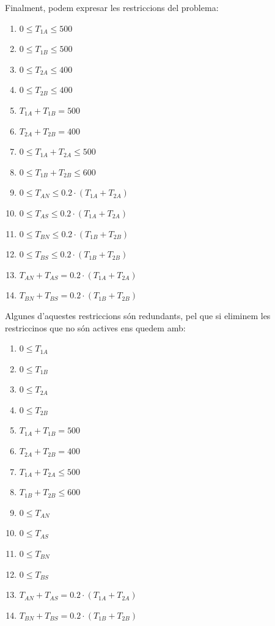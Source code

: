 \documentclass[a4paper, 11pt]{article}
\begin{document}
 \newpage
 \hspace{-1.5em}Finalment, podem expresar les restriccions del problema:
 \begin{enumerate}
     \item  $ 0 \leq T_{1A} \leq 500 $
     \item  $ 0 \leq T_{1B} \leq 500 $
     \item  $ 0 \leq T_{2A} \leq 400 $
     \item  $ 0 \leq T_{2B} \leq 400 $
     \item  $ T_{1A} + T_{1B} = 500 $
     \item  $ T_{2A} + T_{2B} = 400 $
     \item  $ 0 \leq T_{1A}+T_{2A} \leq 500 $
     \item  $ 0 \leq T_{1B}+T_{2B} \leq 600 $
     \item  $ 0 \leq T_{AN} \leq 0.2\cdot (T_{1A}+T_{2A}) $
     \item  $ 0 \leq T_{AS} \leq 0.2\cdot (T_{1A}+T_{2A}) $
     \item  $ 0 \leq T_{BN} \leq 0.2\cdot (T_{1B}+T_{2B}) $
     \item  $ 0 \leq T_{BS} \leq 0.2\cdot (T_{1B}+T_{2B}) $
     \item  $ T_{AN} + T_{AS} = 0.2 \cdot (T_{1A}+T_{2A}) $
     \item  $ T_{BN} + T_{BS} = 0.2 \cdot (T_{1B}+T_{2B}) $
\end{enumerate}
Algunes d'aquestes restriccions són redundants, pel que si eliminem les restriccinos que no són actives ens quedem amb:
\begin{enumerate}
     \item  $ 0 \leq T_{1A} $
     \item  $ 0 \leq T_{1B} $
     \item  $ 0 \leq T_{2A} $
     \item  $ 0 \leq T_{2B} $
     \item  $ T_{1A} + T_{1B} = 500 $
     \item  $ T_{2A} + T_{2B} = 400 $
     \item  $ T_{1A}+T_{2A} \leq 500 $
     \item  $ T_{1B}+T_{2B} \leq 600 $
     \item  $ 0 \leq T_{AN} $
     \item  $ 0 \leq T_{AS} $
     \item  $ 0 \leq T_{BN} $
     \item  $ 0 \leq T_{BS} $
     \item  $ T_{AN} + T_{AS} = 0.2 \cdot (T_{1A}+T_{2A}) $
     \item  $ T_{BN} + T_{BS} = 0.2 \cdot (T_{1B}+T_{2B}) $
\end{enumerate}
\newpage
\end{document}
